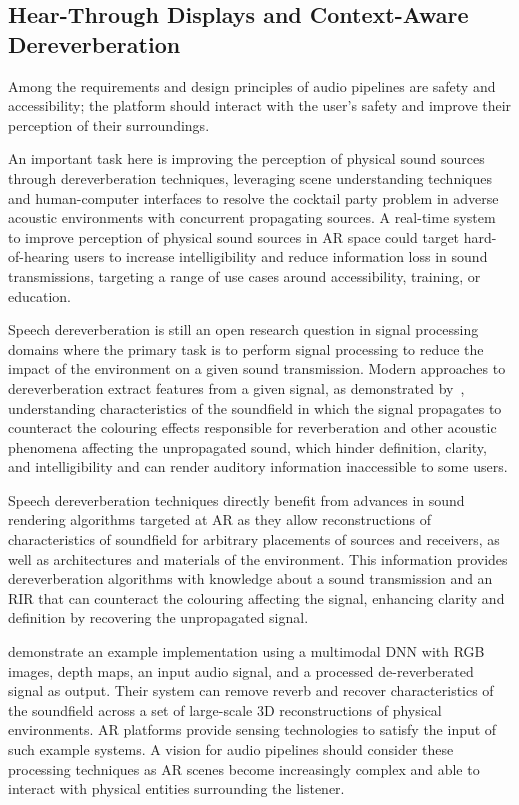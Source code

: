 \subsection{Hear-Through Displays and Context-Aware Dereverberation}
Among the requirements and design principles of audio pipelines are safety and accessibility; the platform should interact with the user's safety and improve their perception of their surroundings. \par
An important task here is improving the perception of physical sound sources through dereverberation techniques, leveraging scene understanding techniques and human-computer interfaces to resolve the cocktail party problem in adverse acoustic environments with concurrent propagating sources. A real-time system to improve perception of physical sound sources in AR space could target hard-of-hearing users to increase intelligibility and reduce information loss in sound transmissions, targeting a range of use cases around accessibility, training, or education. \par
Speech dereverberation is still an open research question in signal processing domains where the primary task is to perform signal processing to reduce the impact of the environment on a given sound transmission. Modern approaches to dereverberation extract features from a given signal, as demonstrated by~\cite{santos2018speech}, understanding characteristics of the soundfield in which the signal propagates to counteract the colouring effects responsible for reverberation and other acoustic phenomena affecting the unpropagated sound, which hinder definition, clarity, and intelligibility and can render auditory information inaccessible to some users.\par
Speech dereverberation techniques directly benefit from advances in sound rendering algorithms targeted at AR as they allow reconstructions of characteristics of soundfield for arbitrary placements of sources and receivers, as well as architectures and materials of the environment. This information provides dereverberation algorithms with knowledge about a sound transmission and an RIR that can counteract the colouring affecting the signal, enhancing clarity and definition by recovering the unpropagated signal. \par
\cite{chen2023learning} demonstrate an example implementation using a multimodal DNN with RGB images, depth maps, an input audio signal, and a processed de-reverberated signal as output. Their system can remove reverb and recover characteristics of the soundfield across a set of large-scale 3D reconstructions of physical environments. AR platforms provide sensing technologies to satisfy the input of such example systems. A vision for audio pipelines should consider these processing techniques as AR scenes become increasingly complex and able to interact with physical entities surrounding the listener.\par

